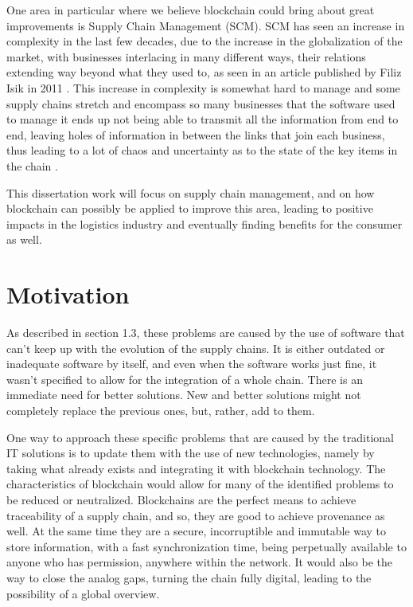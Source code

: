 One area in particular where we believe blockchain could bring about great improvements is Supply Chain Management (SCM). SCM has seen an increase in complexity in the last few decades, due to the increase in the globalization of the market, with businesses interlacing in many different ways, their relations extending way beyond what they used to, as seen in an article published by Filiz Isik in 2011 \cite{Isik2011}.  This increase in complexity is somewhat hard to manage and some supply chains stretch and encompass so many businesses that the software used to manage it ends up not being able to transmit all the information from end to end, leaving holes of information in between the links that join each business, thus leading to a lot of chaos and uncertainty as to the state of the key items in the chain \cite{Wilding1998}. 
   
   This dissertation work will focus on supply chain management, and on how blockchain can possibly be applied to improve this area, leading to positive impacts in the logistics industry and eventually finding benefits for the consumer as well. 




\section{Motivation} \label{sec:motivation}

As described in section 1.3, these problems are caused by the use of software that can't keep up with the evolution of the supply chains. It is either outdated or inadequate software by itself, and even when the software works just fine, it wasn't specified to allow for the integration of a whole chain. There is an immediate need for better solutions. New and better solutions might not completely replace the previous ones, but, rather, add to them.
    
    One way to approach these specific problems that are caused by the traditional IT solutions is to update them with the use of new technologies, namely by taking what already exists and integrating it with blockchain technology. The characteristics of blockchain would allow for many of the identified problems to be reduced or neutralized. Blockchains are the perfect means to achieve traceability of a supply chain, and so, they are good to achieve provenance as well. At the same time they are a secure, incorruptible and immutable way to store information, with a fast synchronization time, being perpetually available to anyone who has permission, anywhere within the network. It would also be the way to close the analog gaps, turning the chain fully digital, leading to the possibility of a global overview.

